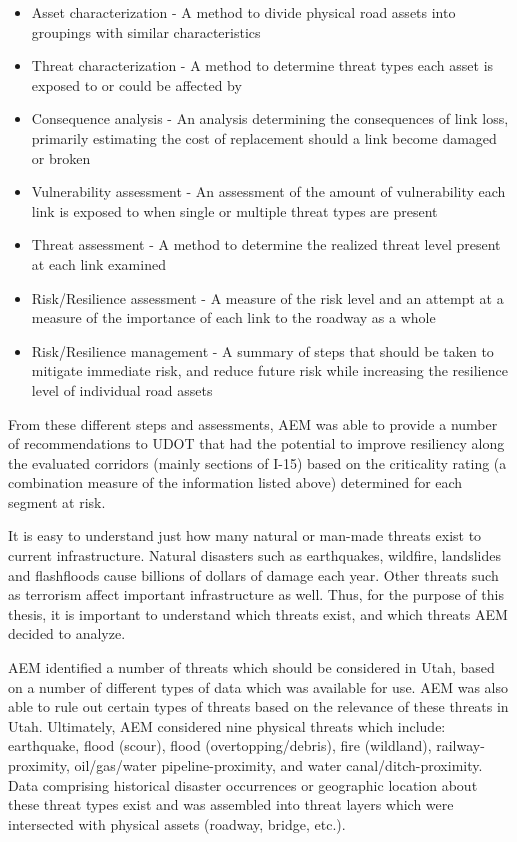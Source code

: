 \begin{itemize}
	\item Asset characterization - A method to divide physical road assets into
	groupings with similar characteristics
	\item Threat characterization - A method to determine threat types each asset
	is exposed to or could be affected by
	\item Consequence analysis - An analysis determining the consequences of link
	loss, primarily estimating the cost of replacement should a link become
	damaged or broken
	\item Vulnerability assessment - An assessment of the amount of vulnerability
	each link is exposed to when single or multiple threat types are present
	\item Threat assessment - A method to determine the realized threat level
	present at each link examined
	\item Risk/Resilience assessment - A measure of the risk level and an attempt
	at a measure of the importance of each link to the roadway as a whole
	\item Risk/Resilience management - A summary of steps that should be taken to
	mitigate immediate risk, and reduce future risk while increasing the
	resilience level of individual road assets
\end{itemize}

From these different steps and assessments,
AEM was able to provide a number of recommendations to UDOT that had the
potential to improve
resiliency along the evaluated corridors (mainly sections of I-15)
based on the criticality rating (a combination measure of the information
listed above) determined for each segment at risk.

It is easy to understand just how many natural or man-made threats exist to
current infrastructure. Natural disasters such as earthquakes, wildfire,
landslides and flashfloods cause billions of dollars of damage each year.
Other threats such as terrorism affect important infrastructure as well.
Thus, for the purpose of this thesis, it is important to understand which
threats exist, and which threats AEM decided to analyze.

AEM identified a number of threats which should be considered in Utah, based
on a number of different types of data which was available for use. AEM was
also able to rule out certain types of threats based on the relevance of these
threats in Utah. Ultimately, AEM considered nine physical threats which
include: earthquake, flood (scour), flood
(overtopping/debris), fire
(wildland), railway-proximity, oil/gas/water pipeline-proximity, and water
canal/ditch-proximity. Data comprising historical disaster occurrences or
geographic location about these threat types exist and was assembled into
threat layers which were intersected with physical assets (roadway,
bridge, etc.).

